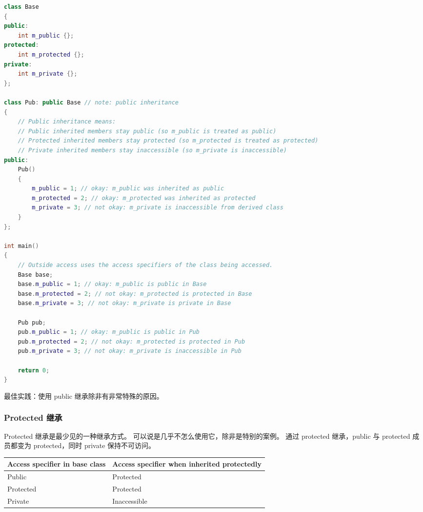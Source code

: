 \documentclass[../../LearnCpp.tex]{subfiles}
\begin{document}
\begin{lstlisting}[language=C++]
class Base
{
public:
    int m_public {};
protected:
    int m_protected {};
private:
    int m_private {};
};

class Pub: public Base // note: public inheritance
{
    // Public inheritance means:
    // Public inherited members stay public (so m_public is treated as public)
    // Protected inherited members stay protected (so m_protected is treated as protected)
    // Private inherited members stay inaccessible (so m_private is inaccessible)
public:
    Pub()
    {
        m_public = 1; // okay: m_public was inherited as public
        m_protected = 2; // okay: m_protected was inherited as protected
        m_private = 3; // not okay: m_private is inaccessible from derived class
    }
};

int main()
{
    // Outside access uses the access specifiers of the class being accessed.
    Base base;
    base.m_public = 1; // okay: m_public is public in Base
    base.m_protected = 2; // not okay: m_protected is protected in Base
    base.m_private = 3; // not okay: m_private is private in Base

    Pub pub;
    pub.m_public = 1; // okay: m_public is public in Pub
    pub.m_protected = 2; // not okay: m_protected is protected in Pub
    pub.m_private = 3; // not okay: m_private is inaccessible in Pub

    return 0;
}
\end{lstlisting}

最佳实践：使用 public 继承除非有非常特殊的原因。

\subsubsection*{Protected 继承}

Protected 继承是最少见的一种继承方式。
可以说是几乎不怎么使用它，除非是特别的案例。
通过 protected 继承，public 与 protected 成员都变为 protected，同时 private 保持不可访问。

\begin{center}
    \begin{tiny}
        \begin{tabularx}{ 1\textwidth}{
                | >{\raggedright\arraybackslash}X
                | >{\raggedright\arraybackslash}X |
            }
            \hline
            Access specifier in base class & Access specifier when inherited protectedly \\
            \hline
            Public                         & Protected                                   \\
            Protected                      & Protected                                   \\
            Private                        & Inaccessible                                \\
            \hline
        \end{tabularx}
    \end{tiny}
\end{center}
\end{document}
